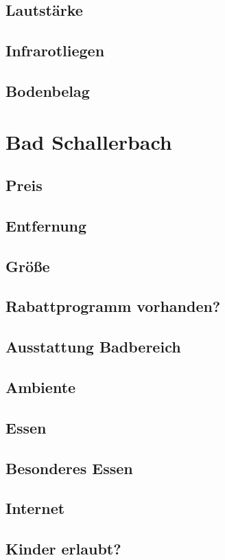\documentclass{article}
\begin{document}
\subsection*{Lautstärke}
\subsection*{Infrarotliegen}
\subsection*{Bodenbelag}

\section*{Bad Schallerbach}
\subsection*{Preis}
\subsection*{Entfernung}
\subsection*{Größe}
\subsection*{Rabattprogramm vorhanden?}
\subsection*{Ausstattung Badbereich}
\subsection*{Ambiente}
\subsection*{Essen}
\subsection*{Besonderes Essen}
\subsection*{Internet}
\subsection*{Kinder erlaubt?}
\end{document}
